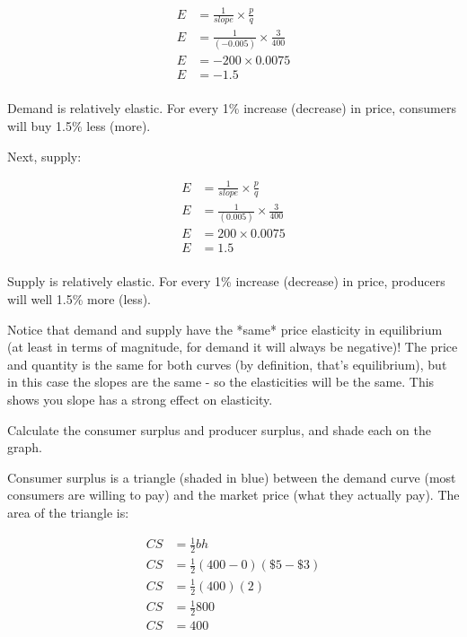 \documentclass[12 pt]{exam}
\begin{document}
\begin{questions}
\begin{solution}
$$\begin{aligned}
E&=\frac{1}{slope}\times \frac{p}{q}\\
E&=\frac{1}{(-0.005)} \times \frac{3}{400}\\
E&=-200 \times 0.0075\\
E&=-1.5\\
\end{aligned}$$

Demand is relatively elastic. For every 1\% increase (decrease) in price, consumers will buy 1.5\% less (more).

Next, supply:

$$\begin{aligned}
E&=\frac{1}{slope}\times \frac{p}{q}\\
E&=\frac{1}{(0.005)} \times \frac{3}{400}\\
E&=200 \times 0.0075\\
E&=1.5\\
\end{aligned}$$

Supply is relatively elastic. For every 1\% increase (decrease) in price, producers will well 1.5\% more (less).

Notice that demand and supply have the *same* price elasticity in equilibrium (at least in terms of magnitude, for demand it will always be negative)! The price and quantity is the same for both curves (by definition, that's equilibrium), but in this case the slopes are the same - so the elasticities will be the same. This shows you slope has a strong effect on elasticity.

\end{solution}
	
\question Calculate the consumer surplus and producer surplus, and shade each on the graph.

\begin{solution}

Consumer surplus is a triangle (shaded in blue) between the demand curve (most consumers are willing to pay) and the market price (what they actually pay). The area of the triangle is:

$$\begin{aligned}
CS &=\frac{1}{2}bh\\
CS &=\frac{1}{2}(400-0)(\$5-\$3)\\
CS &=\frac{1}{2}(400)(2)\\
CS &=\frac{1}{2}800\\
CS &=400\\
\end{aligned}$$


\end{solution}
\end{questions}
\end{document}
